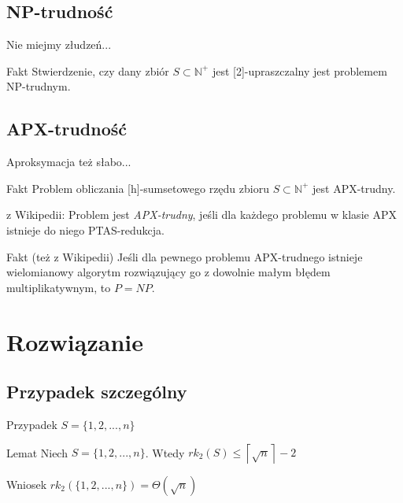 \documentclass{beamer}
\newcommand{\N}{\mathbb{N}}
\begin{document}
	\subsection{NP-trudność}
		\begin{frame}{Nie miejmy złudzeń...}
			\begin{exampleblock}{Fakt}
				Stwierdzenie, czy dany zbiór $ S \subset \N^{+} $ jest [2]-upraszczalny jest problemem NP-trudnym.
			\end{exampleblock}
		\end{frame}
		
	\subsection{APX-trudność}
		\begin{frame}{Aproksymacja też słabo...}
			\begin{exampleblock}{Fakt}
				Problem obliczania [h]-sumsetowego rzędu zbioru $ S \subset \N^{+} $ jest APX-trudny.
			\end{exampleblock}			
			
			\pause
			\begin{block}{z Wikipedii:}
				Problem jest \emph{APX-trudny}, jeśli dla każdego problemu w klasie APX istnieje do niego PTAS-redukcja.
			\end{block}						
			
			\pause
			\begin{exampleblock}{Fakt (też z Wikipedii)}
				Jeśli dla pewnego problemu APX-trudnego istnieje wielomianowy algorytm rozwiązujący go z dowolnie małym błędem multiplikatywnym, to $ P = NP $.
			\end{exampleblock}
			
		\end{frame}
		
\section{Rozwiązanie}
	\subsection{Przypadek szczególny}
		\begin{frame}{Przypadek $ S = \lbrace 1,2,...,n \rbrace $}
			\begin{exampleblock}{Lemat}			
				Niech $ S = \lbrace 1,2,...,n \rbrace $. Wtedy $ rk_{2}(S) \leq \left\lceil \sqrt{n} \right\rceil - 2 $
			\end{exampleblock}
						
			
			\pause			
			\vspace{\baselineskip}
			\begin{exampleblock}{Wniosek}			
				$ rk_{2}\left( \lbrace 1,2,...,n \rbrace \right) = \Theta(\sqrt{n}) $
			\end{exampleblock}
		\end{frame}
		
\end{document}

